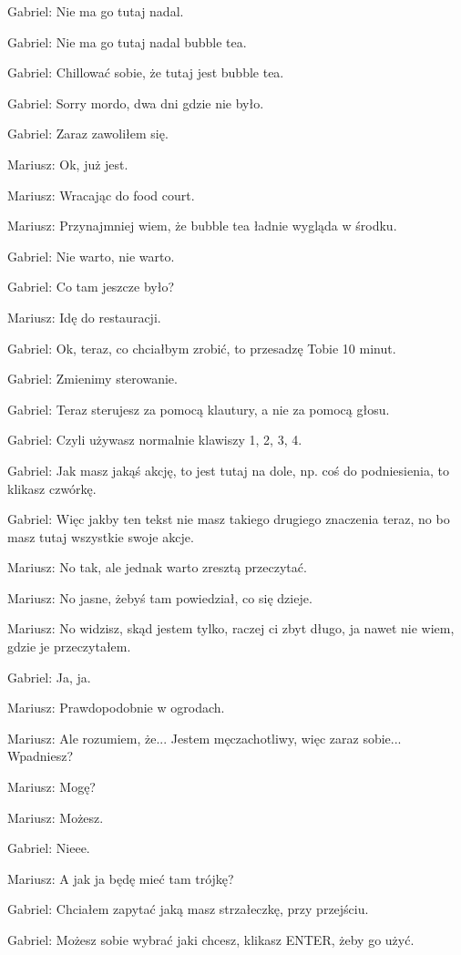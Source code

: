 Gabriel: Nie ma go tutaj nadal.

Gabriel: Nie ma go tutaj nadal bubble tea.

Gabriel: Chillować sobie, że tutaj jest bubble tea.

Gabriel: Sorry mordo, dwa dni gdzie nie było.

Gabriel: Zaraz zawoliłem się.

Mariusz: Ok, już jest.

Mariusz: Wracając do food court.

Mariusz: Przynajmniej wiem, że bubble tea ładnie wygląda w środku.

Gabriel: Nie warto, nie warto.

Gabriel: Co tam jeszcze było?

Mariusz: Idę do restauracji.

Gabriel: Ok, teraz, co chciałbym zrobić, to przesadzę Tobie 10 minut.

Gabriel: Zmienimy sterowanie.

Gabriel: Teraz sterujesz za pomocą klautury, a nie za pomocą głosu.

Gabriel: Czyli używasz normalnie klawiszy 1, 2, 3, 4.

Gabriel: Jak masz jakąś akcję, to jest tutaj na dole, np. coś do podniesienia, to klikasz czwórkę.

Gabriel: Więc jakby ten tekst nie masz takiego drugiego znaczenia teraz, no bo masz tutaj wszystkie swoje akcje.

Mariusz: No tak, ale jednak warto zresztą przeczytać.

Mariusz: No jasne, żebyś tam powiedział, co się dzieje.

Mariusz: No widzisz, skąd jestem tylko, raczej ci zbyt długo, ja nawet nie wiem, gdzie je przeczytałem.

Gabriel: Ja, ja.

Mariusz: Prawdopodobnie w ogrodach.

Mariusz: Ale rozumiem, że... Jestem męczachotliwy, więc zaraz sobie... Wpadniesz?

Mariusz: Mogę?

Mariusz: Możesz.

Gabriel: Nieee.

Mariusz: A jak ja będę mieć tam trójkę?

Gabriel: Chciałem zapytać jaką masz strzałeczkę, przy przejściu.

Gabriel: Możesz sobie wybrać jaki chcesz, klikasz ENTER, żeby go użyć.

